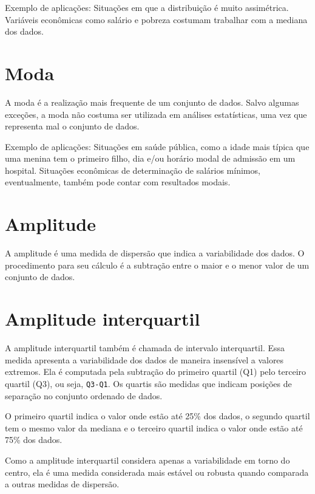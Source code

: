 \documentclass[
]{book}
\begin{document}
Exemplo de aplicações: Situações em que a distribuição é muito assimétrica. Variáveis econômicas como salário e pobreza costumam trabalhar com a mediana dos dados.

\hypertarget{moda}{%
\section{Moda}\label{moda}}

A moda é a realização mais frequente de um conjunto de dados. Salvo algumas exceções, a moda não costuma ser utilizada em análises estatísticas, uma vez que representa mal o conjunto de dados.

Exemplo de aplicações: Situações em saúde pública, como a idade mais típica que uma menina tem o primeiro filho, dia e/ou horário modal de admissão em um hospital. Situações econômicas de determinação de salários mínimos, eventualmente, também pode contar com resultados modais.

\hypertarget{amplitude}{%
\section{Amplitude}\label{amplitude}}

A amplitude é uma medida de dispersão que indica a variabilidade dos dados. O procedimento para seu cálculo é a subtração entre o maior e o menor valor de um conjunto de dados.

\hypertarget{amplitude-interquartil}{%
\section{Amplitude interquartil}\label{amplitude-interquartil}}

A amplitude interquartil também é chamada de intervalo interquartil. Essa medida apresenta a variabilidade dos dados de maneira insensível a valores extremos. Ela é computada pela subtração do primeiro quartil (Q1) pelo terceiro quartil (Q3), ou seja, \texttt{Q3-Q1}. Os quartis são medidas que indicam posições de separação no conjunto ordenado de dados.

O primeiro quartil indica o valor onde estão até 25\% dos dados, o segundo quartil tem o mesmo valor da mediana e o terceiro quartil indica o valor onde estão até 75\% dos dados.

Como a amplitude interquartil considera apenas a variabilidade em torno do centro, ela é uma medida considerada mais estável ou robusta quando comparada a outras medidas de dispersão.
\end{document}
